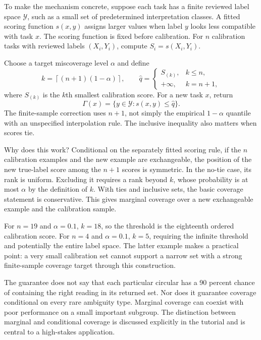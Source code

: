 \documentclass[12pt,a4paper,oneside,openany]{book}
\begin{document}
To make the mechanism concrete, suppose each task has a finite reviewed label
space $\mathcal Y$, such as a small set of predetermined interpretation classes.
A fitted scoring function $s(x,y)$ assigns larger values when label $y$ looks less
compatible with task $x$. The scoring function is fixed before calibration.
For $n$ calibration tasks with reviewed labels $(X_i,Y_i)$, compute
$S_i=s(X_i,Y_i)$.

Choose a target miscoverage level $\alpha$ and define
\begin{equation}
 k=\left\lceil(n+1)(1-\alpha)\right\rceil,
 \qquad
 \widehat q=\begin{cases}
 S_{(k)},&k\leq n,\\
 +\infty,&k=n+1,
 \end{cases}
 \label{eq:conformal-quantile}
\end{equation}
where $S_{(k)}$ is the $k$th smallest calibration score. For a new task $x$, return
\begin{equation}
 \Gamma(x)=\{y\in\mathcal Y:s(x,y)\leq\widehat q\}.
 \label{eq:conformal-set}
\end{equation}
The finite-sample correction uses $n+1$, not simply the empirical $1-\alpha$
quantile with an unspecified interpolation rule. The inclusive inequality also
matters when scores tie.

Why does this work? Conditional on the separately fitted scoring rule, if the
$n$ calibration examples and the new example are exchangeable, the position of
the new true-label score among the $n+1$ scores is symmetric. In the no-tie case,
its rank is uniform. Excluding it requires a rank beyond $k$, whose probability
is at most $\alpha$ by the definition of $k$. With ties and inclusive sets, the
basic coverage statement is conservative. This gives marginal coverage over a
new exchangeable example and the calibration sample.

For $n=19$ and $\alpha=0.1$, $k=18$, so the threshold is the eighteenth ordered
calibration score. For $n=4$ and $\alpha=0.1$, $k=5$, requiring the infinite
threshold and potentially the entire label space. The latter example makes a
practical point: a very small calibration set cannot support a narrow set with a
strong finite-sample coverage target through this construction.

The guarantee does not say that each particular circular has a 90 percent chance
of containing the right reading in its returned set. Nor does it guarantee
coverage conditional on every rare ambiguity type. Marginal coverage can coexist
with poor performance on a small important subgroup. The distinction between
marginal and conditional coverage is discussed explicitly in the tutorial
\citep[section 3]{conformal2022} and is central to a high-stakes application.
\end{document}
